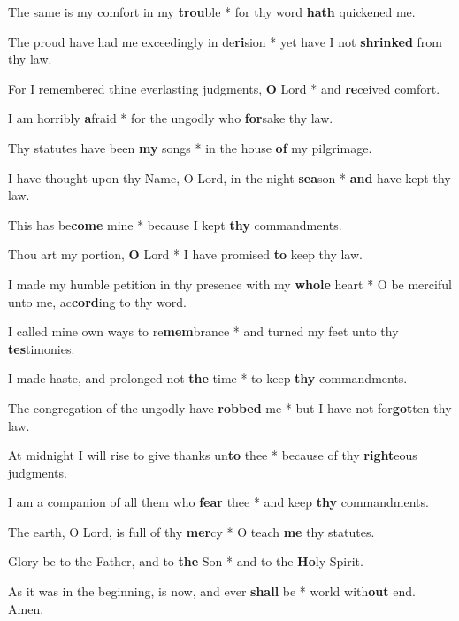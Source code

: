 \begin{multicols}{2}
	The same is my comfort in my \textbf{trou}ble * for thy word \textbf{hath} quickened me.

	The proud have had me exceedingly in de\textbf{ri}sion * yet have I not \textbf{shrinked} from thy law.
	
	For I remembered thine everlasting judgments, \textbf{O} Lord * and \textbf{re}ceived comfort.
	
	I am horribly \textbf{a}fraid * for the ungodly who \textbf{for}sake thy law.
	
	Thy statutes have been \textbf{my} songs * in the house \textbf{of} my pilgrimage.
	
	I have thought upon thy Name, O Lord, in the night \textbf{sea}son * \textbf{and} have kept thy law.
	
	This has be\textbf{come} mine * because I kept \textbf{thy} commandments.
	
	Thou art my portion, \textbf{O} Lord * I have promised \textbf{to} keep thy law.
	
	I made my humble petition in thy presence with my \textbf{whole} heart * O be merciful unto me, ac\textbf{cord}ing to thy word.
	
	I called mine own ways to re\textbf{mem}brance * and turned my feet unto thy \textbf{tes}timonies.
	
	I made haste, and prolonged not \textbf{the} time * to keep \textbf{thy} commandments.
	
	The congregation of the ungodly have \textbf{robbed} me * but I have not for\textbf{got}ten thy law.
	
	At midnight I will rise to give thanks un\textbf{to} thee * because of thy \textbf{right}eous judgments.
	
	I am a companion of all them who \textbf{fear} thee * and keep \textbf{thy} commandments.
	
	The earth, O Lord, is full of thy \textbf{mer}cy * O teach \textbf{me} thy statutes.
	
	Glory be to the Father, and to \textbf{the} Son * and to the \textbf{Ho}ly Spirit.
	
	As it was in the beginning, is now, and ever \textbf{shall} be * world with\textbf{out} end. Amen.
\end{multicols}